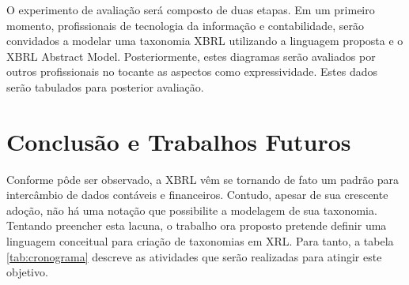 \documentclass[msc,proposal,hidelot,hideabstract]{ppgccufmg} %
\begin{document}
O experimento de avaliação será composto de duas etapas. Em um primeiro momento, profissionais de tecnologia da informação e contabilidade, serão convidados a modelar uma taxonomia XBRL utilizando a linguagem proposta e o XBRL Abstract Model. Posteriormente, estes diagramas serão avaliados por outros profissionais no tocante as aspectos como expressividade. Estes dados serão tabulados para posterior avaliação.

\chapter{Conclusão e Trabalhos Futuros}
\label{ch:conclusao_trab_futuros}

Conforme pôde ser observado, a XBRL vêm se tornando de fato um padrão para intercâmbio de dados contáveis e financeiros. Contudo, apesar de sua crescente adoção, não há uma notação que possibilite a modelagem de sua taxonomia. Tentando preencher esta lacuna, o trabalho ora proposto pretende definir uma linguagem conceitual para criação de taxonomias em XRL. Para tanto, a tabela \ref{tab:cronograma} descreve as atividades que serão realizadas para atingir este objetivo.
\end{document}
